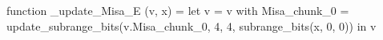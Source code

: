 function _update_Misa_E (v, x) = let v = { v with Misa_chunk_0 = update_subrange_bits(v.Misa_chunk_0, 4, 4, subrange_bits(x, 0, 0)) } in
  v
